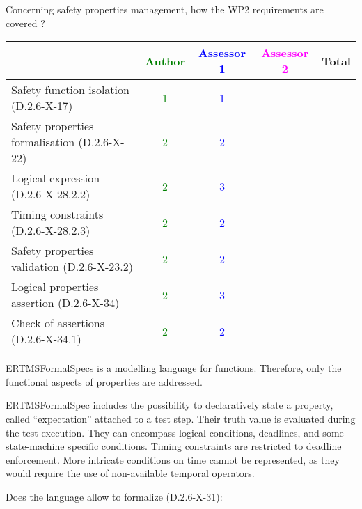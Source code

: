 Concerning safety properties management, how the WP2 requirements are covered ?

\begin{tabular}{|l | c | c | c | c|}
\hline
& \textcolor{green}{Author} & \textcolor{blue}{Assessor 1} & \textcolor{magenta}{Assessor 2} & Total \\
\hline 
Safety function isolation (D.2.6-X-17)  & \textcolor{green}{1} & \textcolor{blue}{1} & &  \\
\hline 
Safety properties formalisation (D.2.6-X-22)  & \textcolor{green}{2} & \textcolor{blue}{2} & &  \\
\hline
Logical expression (D.2.6-X-28.2.2)  & \textcolor{green}{2} & \textcolor{blue}{3} & &  \\
\hline
Timing constraints (D.2.6-X-28.2.3)  & \textcolor{green}{2} & \textcolor{blue}{2} & &  \\
\hline
Safety properties validation (D.2.6-X-23.2)  & \textcolor{green}{2} & \textcolor{blue}{2} & &  \\
\hline
Logical properties assertion (D.2.6-X-34)  & \textcolor{green}{2} & \textcolor{blue}{3} & &  \\
\hline
Check  of assertions (D.2.6-X-34.1)  & \textcolor{green}{2} & \textcolor{blue}{2} & &  \\
\hline
\end{tabular}

\begin{author_comment}
ERTMSFormalSpecs is a modelling language for functions. Therefore, only the functional aspects of properties are addressed.  
\end{author_comment}

\begin{assessor1}
ERTMSFormalSpec includes the possibility to declaratively state a property, called "`expectation"' attached to a test step. Their truth value is evaluated during the test execution. They can encompass logical conditions, deadlines, and some state-machine specific conditions. 
Timing constraints are restricted to deadline enforcement. More intricate conditions on time cannot be represented, as they would require the use of non-available temporal operators. 
\end{assessor1}

Does the language allow to  formalize (D.2.6-X-31):

